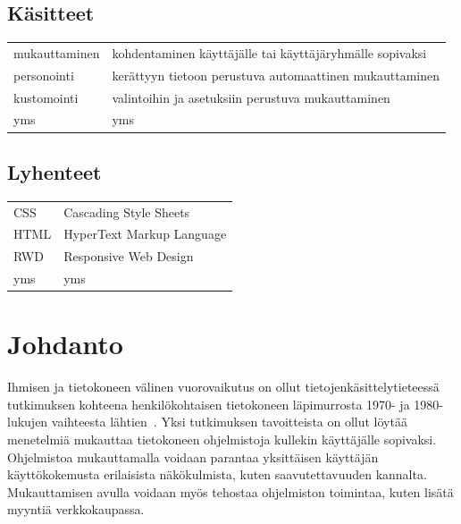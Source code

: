 \documentclass[finnish, 12pt, a4paper, elec, utf8, a-1b, online]{aaltothesis}
\date{xx.xx.2022}
\begin{document}
\makecoverpage{}

\makecopyrightpage{}

\begin{abstractpage}[finnish]
\end{abstractpage}

\thesistableofcontents{}


\subsection*{Käsitteet}

\begin{tabular}{ll}
    mukauttaminen & kohdentaminen käyttäjälle tai käyttäjäryhmälle sopivaksi \\
    personointi   & kerättyyn tietoon perustuva automaattinen mukauttaminen  \\
    kustomointi   & valintoihin ja asetuksiin perustuva mukauttaminen        \\
    yms           & yms
\end{tabular}

\subsection*{Lyhenteet}

\begin{tabular}{ll}
    CSS  & Cascading Style Sheets    \\
    HTML & HyperText Markup Language \\
    RWD  & Responsive Web Design     \\
    yms  & yms
\end{tabular}

\cleardoublepage{}
\section{Johdanto}

Ihmisen ja tietokoneen välinen vuorovaikutus on ollut tietojenkäsittelytieteessä
tutkimuksen kohteena henkilökohtaisen tietokoneen läpimurrosta 1970- ja
1980-lukujen vaihteesta lähtien~\cite{10.1145/800178.810088}. Yksi tutkimuksen
tavoitteista on ollut löytää menetelmiä mukauttaa tietokoneen ohjelmistoja
kullekin käyttäjälle sopivaksi. Ohjelmistoa mukauttamalla voidaan parantaa
yksittäisen käyttäjän käyttökokemusta erilaisista näkökulmista, kuten
saavutettavuuden kannalta. Mukauttamisen avulla voidaan myös tehostaa
ohjelmiston toimintaa, kuten lisätä myyntiä verkkokaupassa.
\end{document}

